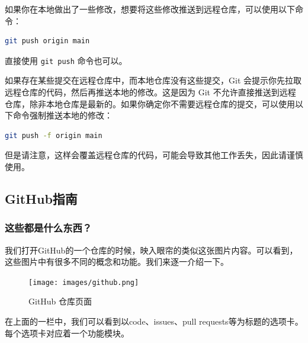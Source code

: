 \documentclass[../main.tex]{subfiles}
\begin{document}
如果你在本地做出了一些修改，想要将这些修改推送到远程仓库，可以使用以下命令：
\begin{lstlisting}[language=bash]
git push origin main
\end{lstlisting}
直接使用 \texttt{git push} 命令也可以。

如果存在某些提交在远程仓库中，而本地仓库没有这些提交，Git 会提示你先拉取远程仓库的代码，然后再推送本地的修改。这是因为 Git 不允许直接推送到远程仓库，除非本地仓库是最新的。如果你确定你不需要远程仓库的提交，可以使用以下命令强制推送本地的修改：
\begin{lstlisting}[language=bash]
git push -f origin main
\end{lstlisting}
但是请注意，这样会覆盖远程仓库的代码，可能会导致其他工作丢失，因此请谨慎使用。

\subsection{GitHub指南}

\subsubsection{这些都是什么东西？}

我们打开GitHub的一个仓库的时候，映入眼帘的类似这张图片内容。可以看到，这些图片中有很多不同的概念和功能。我们来逐一介绍一下。

\begin{figure}[!ht]
  \centering
  \texttt{[image: images/github.png]}
  \caption{GitHub 仓库页面}
  \label{fig:github}
\end{figure}

在上面的一栏中，我们可以看到以code、issues、pull requests等为标题的选项卡。每个选项卡对应着一个功能模块。
\end{document}
